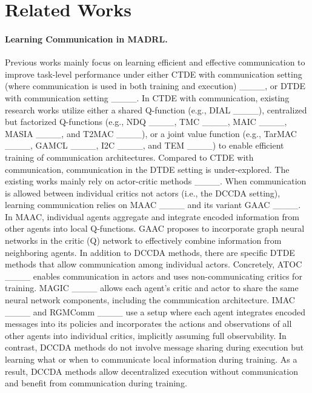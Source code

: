 \section{Related Works}
\label{sec:relatedWorks}

\paragraph{\textnormal{\textbf{Learning Communication in MADRL}}.} Previous works mainly focus on learning efficient and effective communication to improve task-level performance under either CTDE with communication setting (where communication is used in both training and execution) ____, or DTDE with communication setting ____. In CTDE with communication, existing research works utilize either a shared Q-function (e.g., DIAL ____), centralized but factorized Q-functions (e.g., NDQ ____, TMC ____, MAIC ____, MASIA ____, and T2MAC ____), or a joint value function (e.g., TarMAC ____, GAMCL ____, I2C ____, and TEM ____) to enable efficient training of communication architectures. Compared to CTDE with communication, communication in the DTDE setting is under-explored. The existing works mainly rely on actor-critic methods ____. When communication is allowed between individual critics not actors (i.e., the DCCDA setting), learning communication relies on MAAC ____ and its variant GAAC ____. In MAAC, individual agents aggregate and integrate encoded information from other agents into local Q-functions. GAAC proposes to incorporate graph neural networks in the critic (Q) network to effectively combine information from neighboring agents. In addition to DCCDA methods, there are specific DTDE methods that allow communication among individual actors. Concretely, ATOC ____ enables communication in actors and uses non-communicating critics for training. MAGIC ____ allows each agent's critic and actor to share the same neural network components, including the communication architecture. IMAC ____ and RGMComm ____ use a setup where each agent integrates encoded messages into its policies and incorporates the actions and observations of all other agents into individual critics, implicitly assuming full observability. In contrast, DCCDA methods do not involve message sharing during execution but learning what or when to communicate local information during training. As a result, DCCDA methods allow decentralized execution without communication and benefit from communication during training.

